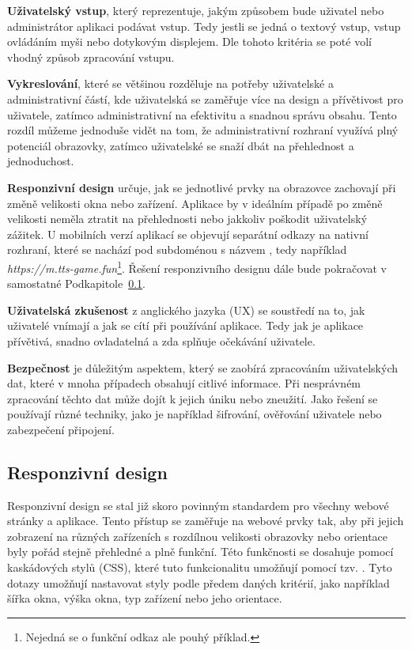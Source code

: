 \begin{description}
    \item \textbf{Uživatelský vstup}, který reprezentuje, jakým způsobem bude uživatel nebo administrátor aplikaci podávat vstup. Tedy jestli se jedná o textový vstup, vstup ovládáním myši nebo dotykovým displejem. Dle tohoto kritéria se poté volí vhodný způsob zpracování vstupu.
    \item \textbf{Vykreslování}, které se většinou rozděluje na potřeby uživatelské a administrativní částí, kde uživatelská se zaměřuje více na design a přívětivost pro uživatele, zatímco administrativní na efektivitu a snadnou správu obsahu. Tento rozdíl můžeme jednoduše vidět na tom, že administrativní rozhraní využívá plný potenciál obrazovky, zatímco uživatelské se snaží dbát na přehlednost a jednoduchost.
    \item \textbf{Responzivní design} určuje, jak se jednotlivé prvky na obrazovce zachovají při změně velikosti okna nebo zařízení. Aplikace by v ideálním případě po změně velikosti neměla ztratit na přehlednosti nebo jakkoliv poškodit uživatelský zážitek. U mobilních verzí aplikací se objevují separátní odkazy na nativní rozhraní, které se nachází pod subdoménou s názvem , tedy například \textit{https://m.tts-game.fun}\footnote{Nejedná se o funkční odkaz ale pouhý příklad.}. Řešení responzivního designu dále bude pokračovat v samostatné Podkapitole~\ref{subsec:ui-gui-theory-responsive-design}.
    \item \textbf{Uživatelská zkušenost} z anglického jazyka \textit{} (UX) se soustředí na to, jak uživatelé vnímají a jak se cítí při používání aplikace. Tedy jak je aplikace přívětivá, snadno ovladatelná a zda splňuje očekávání uživatele.
    \item \textbf{Bezpečnost} je důležitým aspektem, který se zaobírá zpracováním uživatelských dat, které v mnoha případech obsahují citlivé informace. Při nesprávném zpracování těchto dat může dojít k jejich úniku nebo zneužití. Jako řešení se používají různé techniky, jako je například šifrování, ověřování uživatele nebo zabezpečení připojení.
\end{description}

\subsection{Responzivní design}
\label{subsec:ui-gui-theory-responsive-design}
Responzivní design se stal již skoro povinným standardem pro všechny webové stránky a aplikace. Tento přístup se zaměřuje na webové prvky tak, aby při jejich zobrazení na různých zařízeních s rozdílnou velikosti obrazovky nebo orientace byly pořád stejně přehledné a plně funkční. Této funkčnosti se dosahuje pomocí kaskádových stylů (CSS), které tuto funkcionalitu umožňují pomocí tzv. \textit{}. Tyto dotazy umožňují nastavovat styly podle předem daných kritérií, jako například šířka okna, výška okna, typ zařízení nebo jeho orientace.

